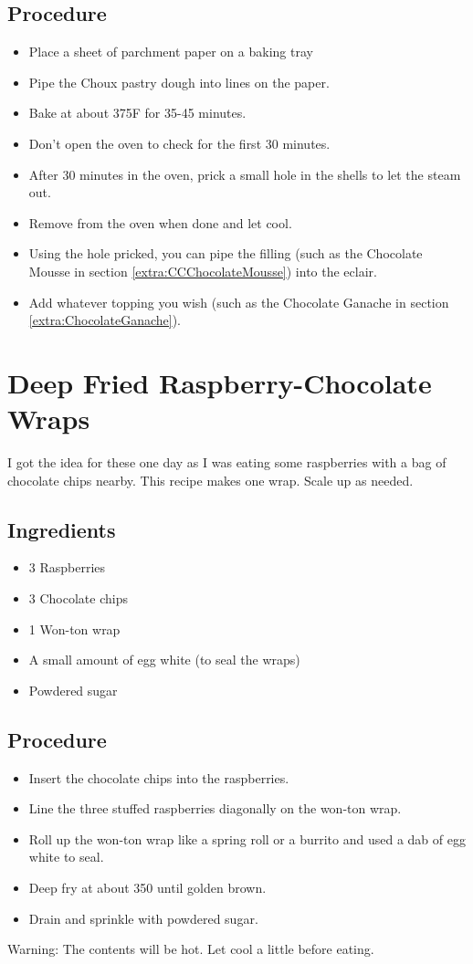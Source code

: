 \documentclass[10pt, openany]{book}
\begin{document}
\subsection{Procedure}
\begin{itemize}
  \item Place a sheet of parchment paper on a baking tray
  \item Pipe the Choux pastry dough into lines on the paper.
  \item Bake at about 375\degree{}F for 35-45 minutes.
  \item Don't open the oven to check for the first 30 minutes.
  \item After 30 minutes in the oven, prick a small hole in the shells to let the steam out.
  \item Remove from the oven when done and let cool.
  \item Using the hole pricked, you can pipe the filling (such as the Chocolate Mousse in section \ref{extra:CCChocolateMousse}) into the eclair.
  \item Add whatever topping you wish (such as the Chocolate Ganache in section \ref{extra:ChocolateGanache}).
\end{itemize}

\section{Deep Fried Raspberry-Chocolate Wraps}
\label{pastry:RaspberryChocolateWrap}
I got the idea for these one day as I was eating some raspberries with a bag of chocolate chips nearby.  This recipe makes one wrap.  Scale up as needed.
\subsection{Ingredients}
\begin{itemize}
  \item 3 Raspberries
  \item 3 Chocolate chips
  \item 1 Won-ton wrap
  \item A small amount of egg white (to seal the wraps)
  \item Powdered sugar
\end{itemize}
\subsection{Procedure}
\begin{itemize}
  \item Insert the chocolate chips into the raspberries.
  \item Line the three stuffed raspberries diagonally on the won-ton wrap.
  \item Roll up the won-ton wrap like a spring roll or a burrito and used a dab of egg white to seal.
  \item Deep fry at about 350\degree{} until golden brown.
  \item Drain and sprinkle with powdered sugar.
\end{itemize}
Warning: The contents will be hot.  Let cool a little before eating.
\end{document}
